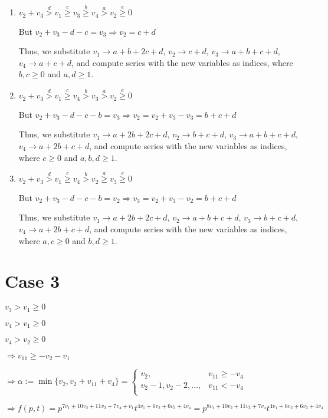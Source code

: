 \documentclass{article}
\begin{document}
\begin{enumerate}
    \item 
$v_2+v_3\overset{d}{>}v_1\overset{c}{\geq}v_3\overset{b}{\geq}{v_4}\overset{a}>v_2\overset{e}{\geq}{0}$

But $v_2+v_3-d-c=v_3\Rightarrow{v_2=c+d}$

Thus, we substitute 
$v_1\rightarrow{a+b+2c+d}$, 
$v_2\rightarrow{c+d}$, 
$v_3\rightarrow{a+b+c+d}$, 
$v_4\rightarrow{a+c+d}$, and compute series with the new variables as indices, where $b,c\geq{0}$ and $a,d\geq{1}$.

\item 
$v_2+v_3\overset{d}{>}v_1\overset{c}{\geq}v_4\overset{b}{>}{v_3}\overset{a}>v_2\overset{e}{\geq}{0}$

But $v_2+v_3-d-c-b=v_3\Rightarrow{v_2=v_2+v_3-v_3=b+c+d}$

Thus, we substitute 
$v_1\rightarrow{a+2b+2c+d}$, 
$v_2\rightarrow{b+c+d}$, 
$v_3\rightarrow{a+b+c+d}$, 
$v_4\rightarrow{a+2b+c+d}$, and compute series with the new variables as indices, where $c\geq{0}$ and $a,b,d\geq{1}$.

\item 
$v_2+v_3\overset{d}{>}v_1\overset{c}{\geq}v_4\overset{b}{>}{v_2}\overset{a}{\geq}v_3\overset{e}{\geq}{0}$

But $v_2+v_3-d-c-b=v_2\Rightarrow{v_3=v_2+v_3-v_2=b+c+d}$

Thus, we substitute 
$v_1\rightarrow{a+2b+2c+d}$, 
$v_2\rightarrow{a+b+c+d}$, 
$v_3\rightarrow{b+c+d}$, 
$v_4\rightarrow{a+2b+c+d}$, and compute series with the new variables as indices, where $a,c\geq{0}$ and $b,d\geq{1}$.

\end{enumerate}

\section{Case 3}
$v_3>v_1\geq{0}$

$v_4>v_1\geq{0}$

$v_4>v_2\geq{0}$

$\Rightarrow{v_{11}}\geq{-v_2-v_1}$

$\Rightarrow\alpha:=\min\{v_2,v_2+v_{11}+v_4\}=\begin{cases}
       v_2, & v_{11}\geq{-v_4}\\
       v_2-1,v_2-2,\dots, & v_{11}<{-v_4}\\
     \end{cases}$

     $\Rightarrow{f(p,t)=p^{7v_1+10v_2+11v_3+7v_4+v_1}t^{4v_1+6v_2+6v_3+4v_4}=p^{8v_1+10v_2+11v_3+7v_4}t^{4v_1+6v_2+6v_3+4v_4}}$
\end{document}
